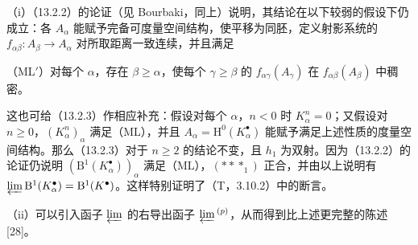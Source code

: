 （i）（13.2.2）的论证（见 Bourbaki，同上）说明，其结论在以下较弱的假设下仍成立：各 $A_\alpha$ 能赋予完备可度量空间结构，使平移为同胚，定义射影系统的 $f_{\alpha\beta}:A_\beta\to A_\alpha$ 对所取距离一致连续，并且满足

\noindent（ML$'$）对每个 $\alpha$，存在 $\beta\geq\alpha$，使每个 $\gamma\geq\beta$ 的 $f_{\alpha\gamma}(A_\gamma)$ 在 $f_{\alpha\beta}(A_\beta)$ 中稠密。

这也可给（13.2.3）作相应补充：假设对每个 $\alpha$，$n<0$ 时 $K_\alpha^n=0$；又假设对 $n\geq0$，$(K_\alpha^n)_\alpha$ 满足（ML），并且 $A_\alpha=\mathrm H^0(K_\alpha^\bullet)$ 能赋予满足上述性质的度量空间结构。那么（13.2.3）对于 $n\geq2$ 的结论不变，且 $h_1$ 为双射。因为（13.2.2）的论证仍说明 $(\mathrm B^1(K_\alpha^\bullet))_\alpha$ 满足（ML），$(***_1)$ 正合，并由以上说明有 $\varprojlim\mathrm B^1(K_\alpha^\bullet)=\mathrm B^1(K^\bullet)$。这样特别证明了（T，3.10.2）中的断言。

（ii）可以引入函子 $\varprojlim$ 的右导出函子 $\varprojlim{}^{(p)}$，从而得到比上述更完整的陈述 [28]。

